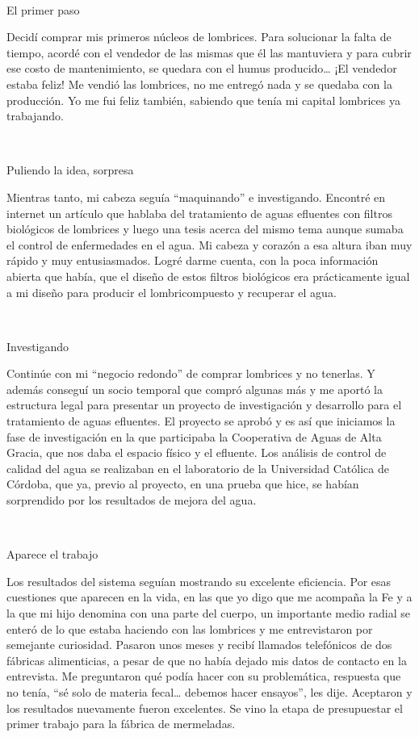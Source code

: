 \begin{fullwidth}
~

El primer paso

Decidí comprar mis primeros núcleos de lombrices. Para solucionar la
falta de tiempo, acordé con el vendedor de las mismas que él las
mantuviera y para cubrir ese costo de mantenimiento, se quedara con el
humus producido\ldots{} ¡El vendedor estaba feliz! Me vendió las
lombrices, no me entregó nada y se quedaba con la producción. Yo me fui
feliz también, sabiendo que tenía mi capital lombrices ya trabajando.

~

Puliendo la idea, sorpresa

Mientras tanto, mi cabeza seguía ``maquinando'' e investigando. Encontré
en internet un artículo que hablaba del tratamiento de aguas efluentes
con filtros biológicos de lombrices y luego una tesis acerca del mismo
tema aunque sumaba el control de enfermedades en el agua. Mi cabeza y
corazón a esa altura iban muy rápido y muy entusiasmados. Logré darme
cuenta, con la poca información abierta que había, que el diseño de
estos filtros biológicos era prácticamente igual a mi diseño para
producir el lombricompuesto y recuperar el agua.

~

Investigando

Continúe con mi ``negocio redondo'' de comprar lombrices y no tenerlas.
Y además conseguí un socio temporal que compró algunas más y me aportó
la estructura legal para presentar un proyecto de investigación y
desarrollo para el tratamiento de aguas efluentes. El proyecto se aprobó
y es así que iniciamos la fase de investigación en la que participaba la
Cooperativa de Aguas de Alta Gracia, que nos daba el espacio físico y el
efluente. Los análisis de control de calidad del agua se realizaban en
el laboratorio de la Universidad Católica de Córdoba, que ya, previo al
proyecto, en una prueba que hice, se habían sorprendido por los
resultados de mejora del agua.

~

Aparece el trabajo

Los resultados del sistema seguían mostrando su excelente eficiencia.
Por esas cuestiones que aparecen en la vida, en las que yo digo que me
acompaña la Fe y a la que mi hijo denomina con una parte del cuerpo, un
importante medio radial se enteró de lo que estaba haciendo con las
lombrices y me entrevistaron por semejante curiosidad. Pasaron unos
meses y recibí llamados telefónicos de dos fábricas alimenticias, a
pesar de que no había dejado mis datos de contacto en la entrevista. Me
preguntaron qué podía hacer con su problemática, respuesta que no tenía,
``sé solo de materia fecal\ldots{} debemos hacer ensayos'', les dije.
Aceptaron y los resultados nuevamente fueron excelentes. Se vino la
etapa de presupuestar el primer trabajo para la fábrica de mermeladas.


\end{fullwidth}
